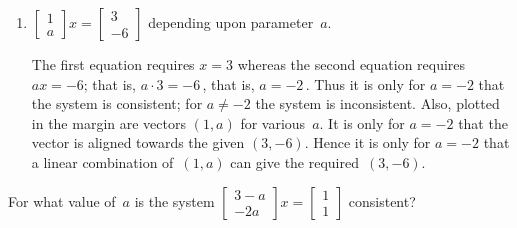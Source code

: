 \begin{example}
\begin{enumerate}
\item \(\begin{bmatrix} 1\\a \end{bmatrix}x
=\begin{bmatrix} 3\\-6 \end{bmatrix}\) depending upon parameter~\(a\).
\begin{solution} 
The first equation requires \(x=3\) whereas the second equation requires \(ax=-6\); that is, \(a\cdot3=-6\)\,, that is, \(a=-2\)\,.
Thus it is only for \(a=-2\) that the system is consistent;
for \(a\neq-2\) the system is inconsistent.
Also, plotted in the margin are vectors \((1,a)\) for various~\(a\).
It is only for \(a=-2\) that the vector is aligned towards the given \((3,-6)\).
Hence it is only for \(a=-2\) that a linear combination of~\((1,a)\) can give the required~\((3,-6)\).
\end{solution}

\end{enumerate}
\end{example}




\begin{activity}
For what value of~\(a\) is the system \(\begin{bmatrix} 3-a\\-2a \end{bmatrix}x=\begin{bmatrix} 1\\1 \end{bmatrix}\) consistent?
\end{activity}



